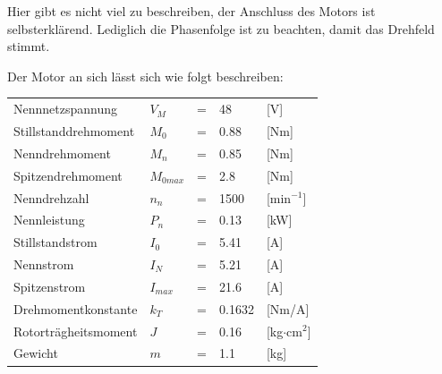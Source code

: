 Hier gibt es nicht viel zu beschreiben, der Anschluss des Motors ist selbsterklärend. Lediglich die Phasenfolge ist zu beachten, damit das Drehfeld stimmt.

Der Motor an sich lässt sich wie folgt beschreiben:

\begin{tabular}{lllll}
Nennnetzspannung & $V_M$ & = & 48 & [V]\\
Stillstanddrehmoment & $M_0$ & = & 0.88 & [Nm]\\
Nenndrehmoment & $M_n$ & = & 0.85 & [Nm]\\
Spitzendrehmoment & $M_{0max}$ & = & 2.8 & [Nm]\\
Nenndrehzahl & $n_n$ & = & 1500 & [min$^{-1}$]\\
Nennleistung & $P_n$ & = & 0.13 & [kW]\\
Stillstandstrom & $I_0$ & = & 5.41 & [A]\\
Nennstrom & $I_N$ & = & 5.21 & [A]\\
Spitzenstrom & $I_{max}$ & = & 21.6 & [A]\\
Drehmomentkonstante & $k_T$ & = & 0.1632 & [Nm/A]\\
Rotorträgheitsmoment & $J$ & = & 0.16 & [kg$\cdot$cm$^2$]\\
Gewicht & $m$ & = & 1.1 & [kg]\\
\end{tabular}